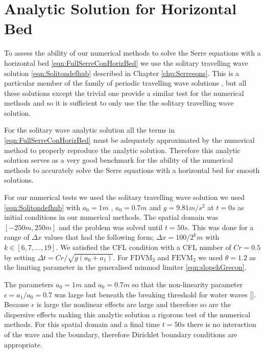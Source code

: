 \section{Analytic Solution for Horizontal Bed}
To assess the ability of our numerical methods to solve the Serre equations with a horizontal bed \eqref{eqn:FullSerreConHorizBed} we use the solitary travelling wave solution \eqref{eqn:Solitondefhub} described in Chapter \ref{chp:Serreeqns}. This is a particular member of the family of periodic travelling wave solutions \cite{El-etal-2006}, but all these solutions except the trivial one provide a similar test for the numerical methods and so it is sufficient to only use the the solitary travelling wave solution.

For the solitary wave analytic solution all the terms in \eqref{eqn:FullSerreConHorizBed} must be adequately approximated by the numerical method to properly reproduce the analytic solution. Therefore this analytic solution serves as a very good benchmark for the ability of the numerical methods to accurately solve the Serre equations with a horizontal bed for smooth solutions.

For our numerical tests we used the solitary travelling wave solution we used \eqref{eqn:Solitondefhub} with $a_0 = 1m$ , $a_0 = 0.7m$ and $g= 9.81m/s^2$ at $t=0s$ as initial conditions in our numerical methods. The spatial domain was $[-250m,250m]$ and the problem was solved until $t= 50s$. This was done for a range of $\Delta x$ values that had the following form; $\Delta x = 100 / 2^k m$ with $k \in  \left[6,7, \dots,19\right]$. We satisfied the CFL condition with a CFL number of $Cr = 0.5$ by setting  $\Delta t = Cr / \sqrt{g\left(a_0 + a_1\right)}$. For $\text{FDVM}_2$ and $\text{FEVM}_2$ we used $\theta  = 1.2$ as the limiting parameter in the generalised minmod limiter \eqref{eqn:slopehGrecon}. 

The parameters $a_0 = 1m$ and $a_0 = 0.7m$ so that the non-linearity parameter $\epsilon = a_1 / a_0 = 0.7$ was large but beneath the breaking threshold for water waves []. Because $\epsilon$ is large the nonlinear effects are large and therefore so are the dispersive effects making this analytic solution a rigorous test of the numerical methods. For this spatial domain and a final time $t=50s$ there is no interaction of the wave and the boundary, therefore Dirichlet boundary conditions are appropriate.

